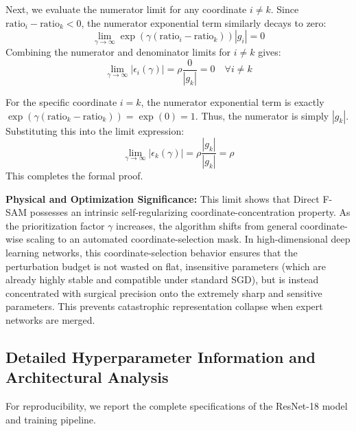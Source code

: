 \documentclass{article}
\theoremstyle{plain}
\theoremstyle{definition}
\theoremstyle{remark}
\begin{document}
Next, we evaluate the numerator limit for any coordinate $i \neq k$. Since $\text{ratio}_i - \text{ratio}_k < 0$, the numerator exponential term similarly decays to zero:
\begin{equation}
    \lim_{\gamma \to \infty} \exp(\gamma(\text{ratio}_i - \text{ratio}_k)) |g_i| = 0
\end{equation}
Combining the numerator and denominator limits for $i \neq k$ gives:
\begin{equation}
    \lim_{\gamma \to \infty} |\epsilon_i(\gamma)| = \rho \frac{0}{|g_k|} = 0 \quad \forall i \neq k
\end{equation}

For the specific coordinate $i = k$, the numerator exponential term is exactly $\exp(\gamma(\text{ratio}_k - \text{ratio}_k)) = \exp(0) = 1$. Thus, the numerator is simply $|g_k|$. Substituting this into the limit expression:
\begin{equation}
    \lim_{\gamma \to \infty} |\epsilon_k(\gamma)| = \rho \frac{|g_k|}{|g_k|} = \rho
\end{equation}
This completes the formal proof. 

\textbf{Physical and Optimization Significance:} 
This limit shows that Direct F-SAM possesses an intrinsic self-regularizing coordinate-concentration property. As the prioritization factor $\gamma$ increases, the algorithm shifts from general coordinate-wise scaling to an automated coordinate-selection mask. In high-dimensional deep learning networks, this coordinate-selection behavior ensures that the perturbation budget is not wasted on flat, insensitive parameters (which are already highly stable and compatible under standard SGD), but is instead concentrated with surgical precision onto the extremely sharp and sensitive parameters. This prevents catastrophic representation collapse when expert networks are merged.

\subsection{Detailed Hyperparameter Information and Architectural Analysis}
For reproducibility, we report the complete specifications of the ResNet-18 model and training pipeline.
\end{document}
